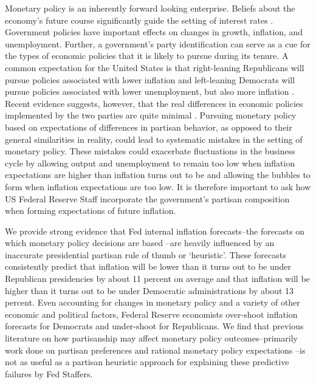 \documentclass[a4paper]{article}
\begin{document}
Monetary policy is an inherently forward looking enterprise. Beliefs about the economy's future course significantly guide the setting of interest rates \citep[59]{Goodhart2001}. Government policies have important effects on changes in growth, inflation, and unemployment. Further, a government's party identification can serve as a cue for the types of economic policies that it is likely to pursue during its tenure. A common expectation for the United States is that right-leaning Republicans will pursue policies associated with lower inflation and left-leaning Democrats will pursue policies associated with lower unemployment, but also more inflation \cite[see][]{Samuelson1977,HibbsJr1977}. Recent evidence suggests, however, that the real differences in economic policies implemented by the two parties are quite minimal \citep{Bartels2008}. Pursuing monetary policy based on expectations of differences in partisan behavior, as opposed to their general similarities in reality, could lead to systematic mistakes in the setting of monetary policy. These mistakes could exacerbate fluctuations in the business cycle by allowing output and unemployment to remain too low when inflation expectations are higher than inflation turns out to be and allowing the bubbles to form when inflation expectations are too low. It is therefore important to ask how US Federal Reserve Staff incorporate the government's partisan composition when forming expectations of future inflation.

We provide strong evidence that Fed internal inflation forecasts--the forecasts on which monetary policy decisions are based \citep[130]{Adolph2013}--are heavily influenced by an inaccurate presidential partisan rule of thumb or `heuristic'. These forecasts consistently predict that inflation will be lower than it turns out to be under Republican presidencies by about 11 percent on average and that inflation will be higher than it turns out to be under Democratic administrations by about 13 percent. Even accounting for changes in monetary policy and a variety of other economic and political factors, Federal Reserve economists over-shoot inflation forecasts for Democrats and under-shoot for Republicans. We find that previous literature on how partisanship may affect monetary policy outcomes--primarily work done on partisan preferences \citep{Clark2012,Hakes1988,Sieg1997,Tootell1996} and rational monetary policy expectations \citep{Alesina1987,Alesina1991,Hibbs1994}--is not as useful as a partisan heuristic approach for explaining these predictive failures by Fed Staffers.
\end{document}
